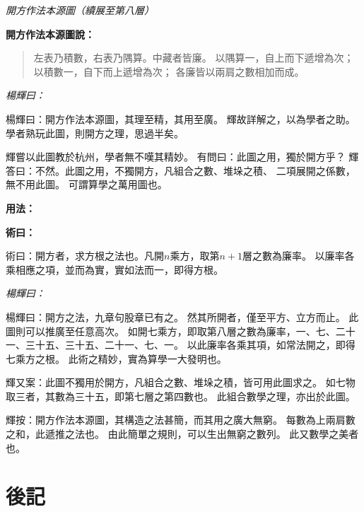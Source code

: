 \documentclass[11pt,a4paper]{article}
\newenvironment{method}{%
  \par\noindent\textcolor{methodcolor}{\textbf{術曰：}}%
  \ignorespaces
}{\par\vspace{0.5em}}
\newenvironment{yanghuicomment}{%
  \par\noindent\textcolor{commentarycolor}{\small\textit{楊輝曰：}}%
  \ignorespaces
}{\par\vspace{0.5em}}
\begin{document}
\begin{center}
\textit{開方作法本源圖（續展至第八層）}
\end{center}

\vspace{1.5em}

\noindent\textbf{開方作法本源圖說：}

\begin{quote}
左表乃積數，右表乃隅算。中藏者皆廉。
以隅算一，自上而下遞增為次；
以積數一，自下而上遞增為次；
各廉皆以兩肩之數相加而成。
\end{quote}

\begin{yanghuicomment}
楊輝曰：開方作法本源圖，其理至精，其用至廣。
輝故詳解之，以為學者之助。
學者熟玩此圖，則開方之理，思過半矣。

輝嘗以此圖教於杭州，學者無不嘆其精妙。
有問曰：此圖之用，獨於開方乎？
輝答曰：不然。此圖之用，不獨開方，凡組合之數、堆垛之積、
二項展開之係數，無不用此圖。
可謂算學之萬用圖也。
\end{yanghuicomment}

\noindent\textbf{用法：}

\begin{method}
術曰：開方者，求方根之法也。凡開$n$乘方，取第$n+1$層之數為廉率。
以廉率各乘相應之項，並而為實，實如法而一，即得方根。
\end{method}

\begin{yanghuicomment}
楊輝曰：開方之法，九章句股章已有之。
然其所開者，僅至平方、立方而止。
此圖則可以推廣至任意高次。
如開七乘方，即取第八層之數為廉率，一、七、二十一、三十五、三十五、二十一、七、一。
以此廉率各乘其項，如常法開之，即得七乘方之根。
此術之精妙，實為算學一大發明也。

輝又案：此圖不獨用於開方，凡組合之數、堆垛之積，皆可用此圖求之。
如七物取三者，其數為三十五，即第七層之第四數也。
此組合數學之理，亦出於此圖。

輝按：開方作法本源圖，其構造之法甚簡，而其用之廣大無窮。
每數為上兩肩數之和，此遞推之法也。
由此簡單之規則，可以生出無窮之數列。
此又數學之美者也。
\end{yanghuicomment}

\newpage

\section*{後記}
\end{document}
